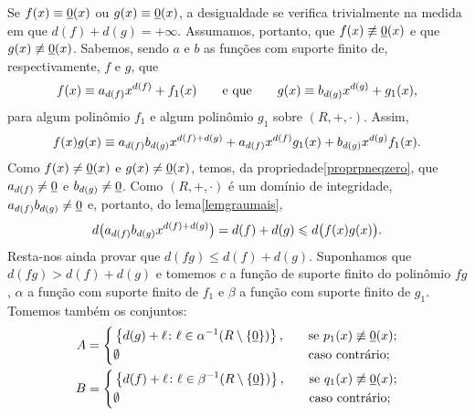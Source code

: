 \begin{dem}
  Se $f(x)\equiv\underline{0}(x)$ ou $g(x)\equiv\underline{0}(x)$, a desigualdade se
  verifica trivialmente na medida em que $d(f)+d(g)=+\infty$. Assumamos,
  portanto, que $f(x)\not\equiv\underline{0}(x)$ e que $g(x)\not\equiv\underline{0}(x)$.
  Sabemos, sendo $a$ e $b$ as funções com suporte finito de,
  respectivamente, $f$ e $g$, que
  \begin{equation*}
      f(x) \equiv a_{d(f)}x^{d(f)} + f_1(x)\qquad\text{e que}\qquad
      g(x) \equiv b_{d(g)}x^{d(g)} + g_1(x)\mathrm{,}
  \end{equation*}
  para algum polinômio $f_1$ e algum polinômio $g_1$ sobre
  $(R,+,\cdot)$. Assim,
  \begin{equation}\label{eqidlemgrauvezes}
    f(x)g(x) \equiv a_{d(f)}b_{d(g)}x^{d(f)+d(g)}
      + a_{d(f)}x^{d(f)}g_1(x) + b_{d(g)}x^{d(g)}f_1(x)\mathrm{.}
  \end{equation}
  Como $f(x)\neq \underline{0}(x)$ e $g(x)\neq\underline{0}(x)$, temos, da
  propriedade\xspace\ref{proprpneqzero}, que
  $a_{d(f)}\neq \underline{0}$ e $b_{d(g)}\neq \underline{0}$. Como $(R,+,\cdot)$ é um
  domínio de integridade, $a_{d(f)}b_{d(g)}\neq\underline{0}$ e, portanto, do
  lema\xspace\ref{lemgraumais},
  \begin{equation*}
    d\bigl(a_{d(f)}b_{d(g)}x^{d(f)+d(g)}\bigr) = d(f)+d(g) \leqslant
    d\bigl(f(x)g(x)\bigr)\mathrm{.}
  \end{equation*}
  Resta-nos ainda provar que $d(fg)\leq d(f)+d(g)$. Suponhamos que
  $d(fg)>d(f)+d(g)$ e tomemos $c$ a função de suporte finito do
  polinômio $fg$, $\alpha$ a função com suporte finito de $f_1$ e
  $\beta$ a função com suporte finito de $g_1$. Tomemos também os
  conjuntos:
  \begin{equation*}
    \begin{aligned}
      A &= \left\{
      \begin{aligned}
        &\cjpp{d(g)+\ell}{\ell\in\alpha^{-1}(R\setminus\cj{\zero})}\MMv
        &\quad&\text{se $p_1(x)\nequiv \zero(x)$;}\\
        &\emptyset&\quad&\text{caso contrário;}
      \end{aligned}
      \right.\\
      B &= \left\{
      \begin{aligned}
        &\cjpp{d(f)+\ell}{\ell\in\beta^{-1}(R\setminus\cj{\zero})}\MMv
        &\quad&\text{se $q_1(x)\nequiv \zero(x)$;}\\
        &\emptyset&\quad&\text{caso contrário;}
      \end{aligned}
      \right.
    \end{aligned}

\end{equation*}
\end{dem}
